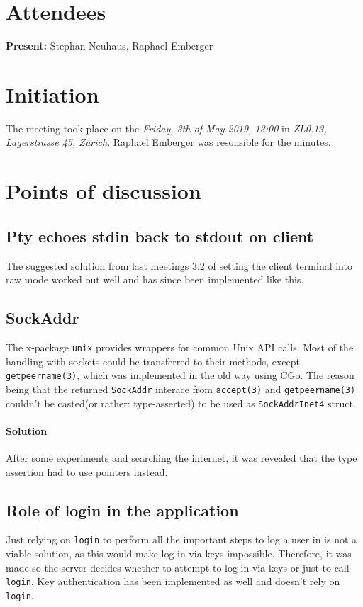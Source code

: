 \documentclass[10pt,a4paper,twoside,english,minutes]{zhawreprt}
\begin{document}
\maketitle

\section{Attendees}\label{sec:Attandees}
\textbf{Present:} Stephan Neuhaus, Raphael Emberger

\section{Initiation}\label{sec:Initiation}
The meeting took place on the \textit{Friday, 3th of May 2019, 13:00} in \textit{ZL0.13, Lagerstrasse 45, Zürich}. Raphael Emberger was resonsible for the minutes.

\section{Points of discussion}
\subsection{Pty echoes stdin back to stdout on client}
The suggested solution from last meetings 3.2 of setting the client terminal into raw mode worked out well and has since been implemented like this.

\subsection{SockAddr}
The x-package \texttt{unix} provides wrappers for common Unix API calls. Most of the handling with sockets could be transferred to their methods, except \texttt{getpeername(3)}, which was implemented in the old way using CGo. The reason being that the returned \texttt{SockAddr} interace from \texttt{accept(3)} and \texttt{getpeername(3)} couldn't be casted(or rather: type-asserted) to be used as \texttt{SockAddrInet4} struct.
\paragraph{Solution}
After some experiments and searching the internet, it was revealed that the type assertion had to use pointers instead.

\subsection{Role of login in the application}
Just relying on \texttt{login} to perform all the important steps to log a user in is not a viable solution, as this would make log in via keys impossible. Therefore, it was made so the server decides whether to attempt to log in via keys or just to call \texttt{login}. Key authentication has been implemented as well and doesn't rely on \texttt{login}.
\end{document}
